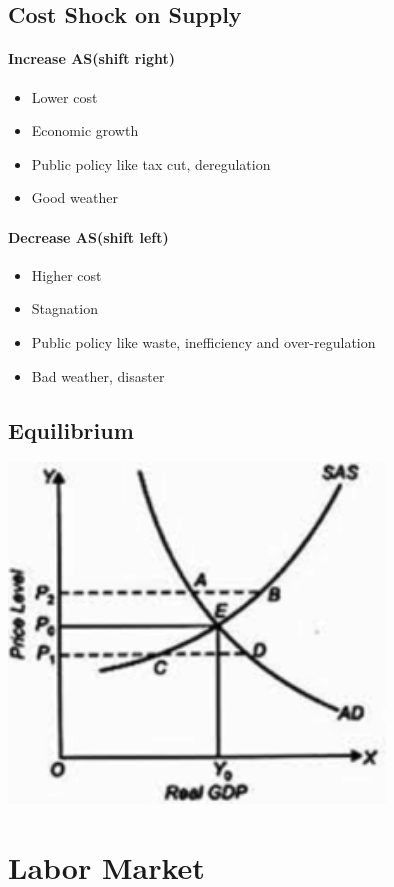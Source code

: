 \documentclass[11pt]{article}
\begin{document}
\subsection{Cost Shock on Supply}
\paragraph{Increase AS(shift right)}
    \begin{itemize}
        \item Lower cost
        \item Economic growth
        \item Public policy like tax cut, deregulation
        \item Good weather
    \end{itemize}
    
\paragraph{Decrease AS(shift left)}
    \begin{itemize}
        \item Higher cost
        \item Stagnation
        \item Public policy like waste, inefficiency and over-regulation
        \item Bad weather, disaster
    \end{itemize}
\subsection{Equilibrium}
\includegraphics[width=10cm]{price_level.png}
\section{Labor Market}
\end{document}
